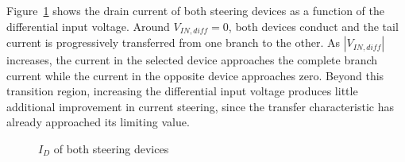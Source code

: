 Figure~\ref{fig:diff_pair_input_sweep} shows the drain current of both steering devices as a function of the differential input voltage. Around $V_{IN,diff}=0$, both devices conduct and the tail current is progressively transferred from one branch to the other. As $|V_{IN,diff}|$ increases, the current in the selected device approaches the complete branch current while the current in the opposite device approaches zero. Beyond this transition region, increasing the differential input voltage produces little additional improvement in current steering, since the transfer characteristic has already approached its limiting value.

\begin{figure}[H]
	\centering
	\caption{$I_{D}$ of both steering devices}\label{fig:diff_pair_input_sweep}
\end{figure}

